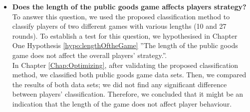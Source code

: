 \begin{itemize}
    
    \item \textbf{Does the length of the public goods game affects players strategy?}\\
    To answer this question, we used the proposed classification method to classify players of two different games with various lengths (10 and 27 rounds). To establish a test for this question, we hypothesised in Chapter One Hypothesis  \ref{hypo:lengthOftheGame} ''The length of the public goods game does not affect the overall players' strategy.''. \\
    In Chapter \ref{Chap:Optimizing}, after validating the proposed classification method, we classified both public goods game data sets. Then, we compared the results of both data sets; we did not find any significant difference between players' classification. Therefore, we concluded that it might be an indication that the length of the game does not affect player behaviour.
    

\end{itemize}
